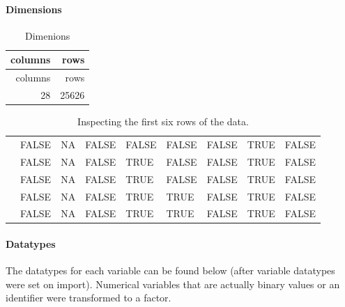 \documentclass[12pt]{article}
\begin{document}
\hypertarget{dimensions}{%
\paragraph{Dimensions}\label{dimensions}}

\begin{longtable}[]{@{}rr@{}}
\caption{Dimenions}\tabularnewline
\toprule
columns & rows\tabularnewline
\midrule
\endfirsthead
\toprule
columns & rows\tabularnewline
\midrule
\endhead
28 & 25626\tabularnewline
\bottomrule
\end{longtable}

\begin{landscape}\begin{table}

\caption{\label{tab:unnamed-chunk-3}Inspecting the first six rows of the data.}
\centering
\fontsize{6}{8}\selectfont
\begin{tabu} to 
\hline
{} &  &  &  &  &  &  &  & \\
 & FALSE & NA & FALSE & FALSE & FALSE & FALSE & TRUE & FALSE\\
 & FALSE & NA & FALSE & TRUE & FALSE & FALSE & TRUE & \vphantom{1} FALSE\\
 & FALSE & NA & FALSE & TRUE & FALSE & FALSE & TRUE & FALSE\\
 & FALSE & NA & FALSE & TRUE & TRUE & FALSE & TRUE & \vphantom{1} FALSE\\
 & FALSE & NA & FALSE & TRUE & TRUE & FALSE & TRUE & FALSE\\
\hline
\end{tabu}
\end{table}
\end{landscape}

\hypertarget{datatypes}{%
\paragraph{Datatypes}\label{datatypes}}

The datatypes for each variable can be found below (after variable
datatypes were set on import). Numerical variables that are actually
binary values or an identifier were transformed to a factor.
\end{document}
